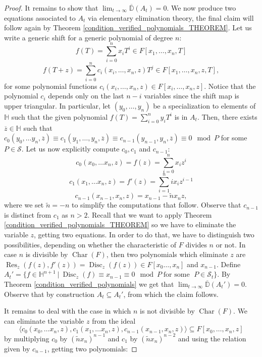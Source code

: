 \documentclass[10pt]{amsart}
\DeclareMathOperator{\disc}{Disc}
\DeclareMathOperator{\res}{Res}
\DeclareMathOperator{\Char}{Char}
\newcommand{\vH}{\mathbb{H}}
\newcommand{\vD}{\mathbb{D}}
\newcommand{\cS}{\mathcal{S}}
\theoremstyle{definition}
\theoremstyle{remark}
\numberwithin{equation}{section}
\begin{document}
\begin{proof}
It remains to show that $\lim_{t\rightarrow \infty} \overline{\vD}(A_t)=0$. 
We now produce two equations associated to $A_t$ via elementary elimination theory, the final claim will follow again by Theorem \ref{condition_verified_polynomials_THEOREM}.
Let us write a generic shift for a generic polynomial of degree $n$:
\[f(T)=\sum^n_{i=0} x_i T^i\in F[x_1,\dots, x_n,T]\]
\[f(T+z)=\sum^n_{i=0}c_i(x_i,\dots, x_n,z)T^j\in F[x_1,\dots, x_n,z,T],\]
for some polynomial functions $c_i(x_i,\dots, x_n,z)\in F[x_i,\dots, x_n,z]$. Notice that the polynomial $c_i$ depends only on the last $n-i$ variables since the shift map is upper triangular.
In particular, let $(y_0,\dots, y_n)$ be a specialization to elements of $\vH$ such that the given polynomial $f(T)=\sum^n_{i=0} y_i T^i$ is in $A_t$. Then,  there exists $\overline z\in \vH$ such that $c_0(y_0,\dots y_n,\overline z)\equiv c_1(y_1,\dots,y_n,\overline z)\equiv c_{n-1}(y_{n-1},y_n,\overline z)\equiv 0 \mod P$ for some $P\in \cS$.
Let us now explicitly compute $c_0,c_1$ and $c_{n-1}$:
\[c_0(x_0,\dots x_n, z)=f(z)=\sum^n_{i=0} x_iz^{i}\]
\[c_1(x_1,\dots x_n, z)=f'(z)=\sum^n_{i=1} i x_iz^{i-1}\]
\[c_{n-1}(x_{n-1},x_n, z)=x_{n-1}-\tilde{n}x_n z,\]
where we set $\tilde n=-n$ to simplify the computations that follow. Observe that $c_{n-1}$ is distinct from $c_1$ as $n>2$.
Recall that we want to apply Theorem \ref{condition_verified_polynomials_THEOREM} so we have to eliminate the variable $z$, getting two equations. In order to do that, we have to distinguish two possibilities, depending on whether the characteristic of $F$ divides $n$ or not.
In case $n$ is divisible by $\Char(F)$, then two polynomials which eliminate $z$ are $\res_z(f(z),f'(z))=\disc_z(f(z))\in F[x_0\dots,x_n]$ and $x_{n-1}$.
Define $A_t'=\{f\in \vH^{n+1}\:|\: \disc_z(f)\equiv x_{n-1}\equiv 0\mod P \;\text{for some }\; P\in \cS_t\}$. By Theorem \ref{condition_verified_polynomials} we get 
that $\lim_{t \rightarrow \infty} \overline{\vD}(A_t')=0$.
Observe that by construction $A_t\subseteq A_t'$, from which the claim follows.

It remains to deal with the case in which $n$ is not divisible by $\Char(F)$.
We can eliminate the variable $z$ from the ideal 
\[\langle c_0(x_0,\dots x_n, z),c_1(x_1,\dots x_n, z),c_{n-1}(x_{n-1},x_n, z)\rangle\subseteq F[x_0,\dots, x_n, z]\]
by multiplying $c_0$  by $(\tilde n x_n)^{n-1}$ and $c_1$ by $(\tilde n x_n)^{n-2}$ and using the relation given by $c_{n-1}$, getting two polynomials: 


\end{proof}
\end{document}
